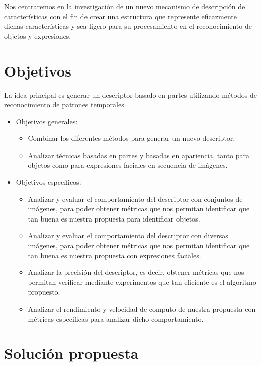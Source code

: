 Nos centraremos en la investigación de un nuevo mecanismo de descripción de características con el fin de crear una estructura que represente eficazmente dichas características y sea ligero para su procesamiento en el reconocimiento de objetos y expresiones.

\section{Objetivos}
La idea principal es generar un descriptor basado en partes utilizando métodos de reconocimiento de patrones temporales.
\begin{itemize}
		\item Objetivos generales:
			\begin{itemize}
				\item Combinar los diferentes métodos para generar un nuevo descriptor.
				\item Analizar técnicas basadas en partes y basadas en apariencia, tanto para objetos como para expresiones faciales en secuencia de imágenes.
			\end{itemize}
		\item Objetivos específicos:
			\begin{itemize}
				\item Analizar y evaluar el comportamiento del descriptor con conjuntos de imágenes, para poder obtener métricas que nos permitan identificar que tan buena es nuestra propuesta para identificar objetos.
				\item Analizar y evaluar el comportamiento del descriptor con diversas imágenes, para poder obtener métricas que nos permitan identificar que tan buena es nuestra propuesta con expresiones faciales.
				\item Analizar la precisión del descriptor, es decir, obtener métricas que nos permitan verificar mediante experimentos que tan eficiente es el algoritmo propuesto.
				\item Analizar el rendimiento y velocidad de computo de nuestra propuesta con métricas especificas para analizar dicho comportamiento.
				
			\end{itemize}			

	\end{itemize}

\section{Solución propuesta}

